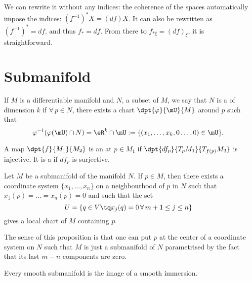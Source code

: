 We can rewrite it without  any indices: the coherence of the spaces automatically impose the indices: $(f^{-1})^*X=(df)X$. It can also be rewritten as $(f^{-1})^*=df$, and thus $f_*=df$. From there to $f_{* \xi}=(df)_{\xi}$, it is straightforward.

\section{Submanifold}

\begin{definition}      \label{DEFooLQHWooMOTgzq}
    If $M$ is a differentiable manifold and $N$, a subset of $M$, we say that $N$ is a  of dimension $k$ if $\forall\,p\in N$, there exists a chart $\dpt{\varphi}{\mU}{M}$ around $p$ such that
    \begin{equation}
       \varphi^{-1}(\varphi(\mU)\cap N)=\eR^k\cap\mU:=\{(x_1,\ldots,x_k,0\ldots,0)\in\mU\}.
    \end{equation}
\end{definition}

\begin{definition}      \label{DEFooZKUIooXWVGvh}
    A map $\dpt{f}{M_1}{M_2}$ is an  at $p\in M_1$ if $\dpt{df_p}{T_pM_1}{T_{f(p)}M_2}$ is injective. It is a  if $df_p$ is surjective.
\end{definition}

\begin{proposition}       \label{PROPooLJYEooMjevio}
    Let $M$ be a submanifold of the manifold $N$. If $p\in M$, then there  exists a coordinate system $\{x_1,\ldots,x_n\}$ on a neighbourhood of $p$ in $N$ such that $x_1(p)=\ldots=x_n(p)=0$ and such that the set
    \[
    U=\{q\in V\tq x_j(q)=0\,\forall\, m+1\leq j\leq n\}
    \]
    gives a local chart of $M$ containing $p$.
\end{proposition}

The sense of this proposition is that one can put $p$ at the center of a coordinate system on $N$ such that $M$ is just a submanifold of $N$ parametrised by the fact that its last $m-n$ components are zero.

\begin{proposition}
    Every smooth submanifold is the image of a smooth immersion.
\end{proposition}

